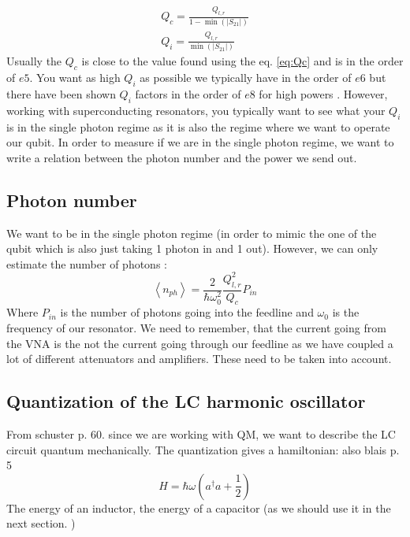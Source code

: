         \begin{equation}
            \begin{gathered}
                Q_c=\frac{Q_{l,r}}{1-\min \left(\left|S_{21}\right|\right)} \\
                Q_i=\frac{Q_{l,r}}{\min \left(\left|S_{21}\right|\right)}
            \end{gathered}
        \end{equation}
        Usually the $Q_c$ is close to the value found using the eq. \ref{eq:Qc} and is in the order of $e5$. You want as high $Q_i$ as possible we typically have in the order of  $e6$ but there have been shown $Q_i$ factors in the order of $e8$ for high powers \cite{Crowley2023b}. However, working with superconducting resonators, you typically want to see what your $Q_i$ is in the single photon regime as it is also the regime where we want to operate our qubit. In order to measure if we are in the single photon regime, we want to write a relation between the photon number and the power we send out. 


    \subsection{Photon number}
        We want to be in the single photon regime (in order to mimic the one of the qubit which is also just taking 1 photon in and 1 out). However, we can only estimate the number of photons \cite{Bruno2015}: 
        \begin{equation}
            \left\langle n_{p h}\right\rangle=\frac{2}{\hbar \omega_0^2} \frac{Q_{l,r}^2}{Q_c} P_{i n}
        \end{equation}
        Where $P_{in}$ is the number of photons going into the feedline and $\omega_0$ is the frequency of our resonator. We need to remember, that the current going from the VNA is the not the current going through our feedline as we have coupled a lot of different attenuators and amplifiers. These need to be taken into account. 
        

    \subsection{Quantization of the LC harmonic oscillator}
    From schuster p. 60. since we are working with QM, we want to describe the LC circuit quantum mechanically. The quantization gives a hamiltonian: 
    also blais p. 5
    \begin{equation}
        H = \hbar \omega (a^{\dagger} a + \frac{1}{2})
    \end{equation} 
    The energy of an inductor, the energy of a capacitor (as we should use it in the next section. )